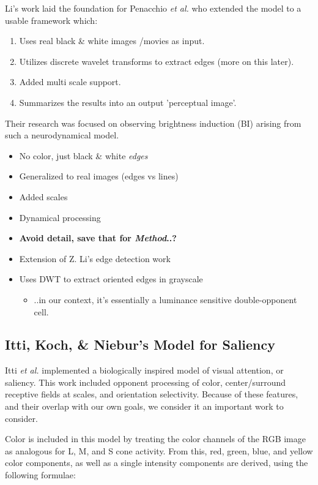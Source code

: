 \documentclass[journal,onecolumn]{IEEEtran}
\begin{document}
Li's work laid the foundation for Penacchio \textit{et al.} who extended the model to a usable framework which:
\begin{enumerate}
    \item Uses real black \& white images /movies as input.
    \item Utilizes discrete wavelet transforms to extract edges (more on this later).
    \item Added multi scale support.
    \item Summarizes the results into an output 'perceptual image'.
\end{enumerate}
Their research was focused on observing brightness induction (BI) arising from such a neurodynamical model.
\begin{itemize}
    \item No color, just black \& white \textit{edges}
    \item Generalized to real images (edges vs lines)
    \item Added scales
    \item Dynamical processing
    \item \textbf{Avoid detail, save that for \textit{Method}..?}
    \item Extension of Z. Li's edge detection work
    \item Uses DWT to extract oriented edges in grayscale
    \begin{itemize}
        \item ..in our context, it's essentially a luminance sensitive double-opponent cell.
    \end{itemize}
\end{itemize}

\subsection*{Itti, Koch, \& Niebur's Model for Saliency \cite{itti:1998}}

Itti \textit{et al.} implemented a biologically inspired model of visual attention, or saliency. This work included opponent processing of color, center/surround receptive fields at scales, and orientation selectivity. Because of these features, and their overlap with our own goals, we consider it an important work to consider.

Color is included in this model by treating the color channels of the RGB image as analogous for L, M, and S cone activity. From this, red, green, blue, and yellow color components, as well as a single intensity components are derived, using the following formulae:
\end{document}
